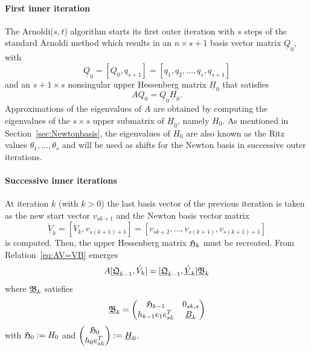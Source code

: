 \documentclass{scrartcl}
\numberwithin{equation}{section}
\begin{document}
\paragraph{First inner iteration} The Arnoldi($s,t$) algorithm starts its first outer iteration with $s$ steps of the standard Arnoldi method which results in an $n \times s + 1$ basis vector matrix $\underline{Q}_0$, with
\begin{equation}
\underline{Q}_0 = [Q_0, q_{s + 1}] = [q_1, q_2, \ldots, q_s, q_{s + 1}]
\end{equation}
and an $s + 1 \times s$ nonsingular upper Hessenberg matrix $\underline{H}_0$ that satisfies
\begin{equation}
AQ_0 = \underline{Q}_0 \underline{H}_0.
\end{equation}
Approximations of the eigenvalues of $A$ are obtained by computing the eigenvalues of the $s \times s$ upper submatrix of $\underline{H}_0$, namely $H_0$. As mentioned in Section~\ref{sec:Newtonbasis}, the eigenvalues of $H_0$ are also known as the Ritz values $\theta_1, \ldots, \theta_s$ and will be used as shifts for the Newton basis in successive outer iterations.\\

\paragraph{Successive inner iterations} At iteration $k$ (with $k > 0$) the last basis vector of the previous iteration is taken as the new start vector $v_{sk + 1}$ and the Newton basis vector matrix \begin{equation}
 \underline{\acute{V}}_k = [\acute{V}_k, v_{s(k + 1) + 1}] = [v_{sk+2}, \ldots, v_{s(k + 1)}, v_{s(k + 1) + 1}]
\end{equation}
is computed. Then, the upper Hessenberg matrix $\frak{H}_k$ must be recreated. From Relation~\eqref{eq:AV=VB} emerges
\begin{equation}
A [\underline{\frak{Q}}_{k - 1}, \acute{V}_k] = [\underline{\frak{Q}}_{k - 1}, \underline{\acute{V}}_k]\underline{\frak{B}}_k
\end{equation}
where $\underline{\frak{B}}_k$ satisfies
\begin{equation} \label{eq:B_blackletter_k_}
\underline{\frak{B}}_k = 
\begin{pmatrix}
	\frak{H}_{k - 1} & 0_{sk, s} \\
	h_{k - 1} e_1 e^T_{sk} & \underline{B}_k \\
\end{pmatrix}
\end{equation}
with $\frak{H}_0 := H_0$ and $
 \begin{pmatrix}
 \frak{H}_0\\
 h_{0} e^T_{sk} 
 \end{pmatrix}
:= \underline{H}_0
$.\\
\end{document}
